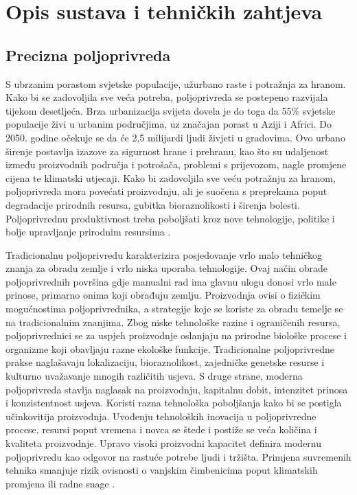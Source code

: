 \chapter{Opis sustava i tehničkih zahtjeva}

\section{Precizna poljoprivreda}

S ubrzanim porastom svjetske populacije, užurbano raste i potražnja za hranom. Kako bi se zadovoljila sve veća potreba, poljoprivreda se postepeno razvijala tijekom desetljeća. Brza urbanizacija svijeta dovela je do toga da 55\% svjetske populacije živi u urbanim područjima, uz značajan porast u Aziji i Africi. Do 2050. godine očekuje se da će 2,5 milijardi ljudi živjeti u gradovima. Ovo urbano širenje postavlja izazove za sigurnost hrane i prehranu, kao što su udaljenost između proizvodnih područja i potrošača, problemi s prijevozom, nagle promjene cijena te klimatski utjecaji. Kako bi zadovoljila sve veću potražnju za hranom, poljoprivreda mora povećati proizvodnju, ali je suočena s preprekama poput degradacije prirodnih resursa, gubitka bioraznolikosti i širenja bolesti. Poljoprivrednu produktivnost treba poboljšati kroz nove tehnologije, politike i bolje upravljanje prirodnim resursima \cite{modern_challenges}. 

Tradicionalnu poljoprivredu karakterizira posjedovanje vrlo malo tehničkog znanja za obradu zemlje i vrlo niska uporaba tehnologije. Ovaj način obrade poljoprivrednih površina gdje manualni rad ima glavnu ulogu donosi vrlo male prinose, primarno onima koji obrađuju zemlju. Proizvodnja ovisi o fizičkim mogućnostima poljoprivrednika, a strategije koje se koriste za obradu temelje se na tradicionalnim znanjima. Zbog niske tehnološke razine i ograničenih resursa, poljoprivrednici se za uspjeh proizvodnje oslanjaju na prirodne biološke procese i organizme koji obavljaju razne ekološke funkcije. Tradicionalne poljoprivredne prakse naglašavaju lokalizaciju, bioraznolikost, zajedničke genetske resurse i kulturno uvažavanje mnogih različitih usjeva. S druge strane, moderna poljoprivreda stavlja naglasak na proizvodnju, kapitalnu dobit, intenzitet prinosa i konzistentnost usjeva. Koristi razna tehnološka poboljšanja kako bi se postigla učinkovitija proizvodnja. Uvođenju tehnoloških inovacija u poljoprivredne procese, resursi poput vremena i novca se štede i postiže se veća količina i kvaliteta proizvodnje. Upravo visoki proizvodni kapacitet definira modernu poljoprivredu kao odgovor na rastuće potrebe ljudi i tržišta. Primjena suvremenih tehnika smanjuje rizik ovisnosti o vanjskim čimbenicima poput klimatskih promjena ili radne snage \cite{trad_poljo}.

